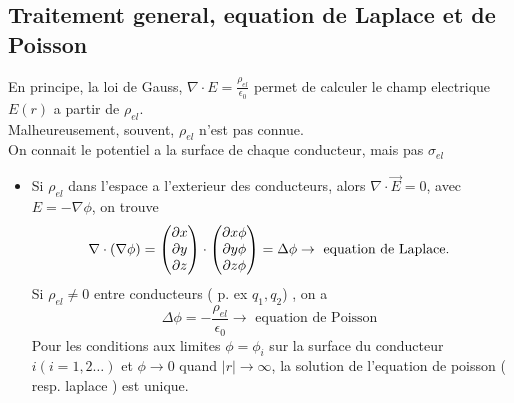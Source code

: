 \documentclass[../main.tex]{subfiles}
\begin{document}
\subsection{Traitement general, equation de Laplace et de Poisson}
En principe, la loi de Gauss, $\nabla \cdot E = \frac{\rho_{el} }{\epsilon_0}$ permet de calculer le champ electrique $E( r) $ a partir de $\rho_{el} $.\\
Malheureusement, souvent, $\rho_{el} $ n'est pas connue.\\
On connait le potentiel a la surface de chaque conducteur, mais pas $\sigma_{el} $ 
\begin{itemize}
\item Si $\rho_{el} $ dans l'espace a l'exterieur des conducteurs, alors $\nabla \cdot \vec{E}=0$, avec $E = - \nabla \phi$, on trouve
	\[ 
		\nabla \cdot ( \nabla \phi) = \begin{pmatrix}
		\partial x\\ \partial y \\ \partial z
		\end{pmatrix} 	\cdot
 \begin{pmatrix}
		\partial x\phi\\ \partial y\phi \\ \partial z\phi
		\end{pmatrix} 	
		= \Delta \phi \to  \text{ equation de Laplace. } 
	\]
	Si $\rho_{el} \neq 0$ entre conducteurs ( p. ex $q_1, q_2$) , on a
	\[ 
	\Delta  \phi = - \frac{\rho_{el} }{\epsilon_0} \to \text{ equation de Poisson } 
	\]
	Pour les conditions aux limites $\phi= \phi_i$ sur la surface du conducteur $i( i= 1,2 \ldots) $ et $\phi \to 0$ quand $|r| \to \infty $, la solution de l'equation de poisson ( resp. laplace ) est unique.
	
\end{itemize}



		
\end{document}
